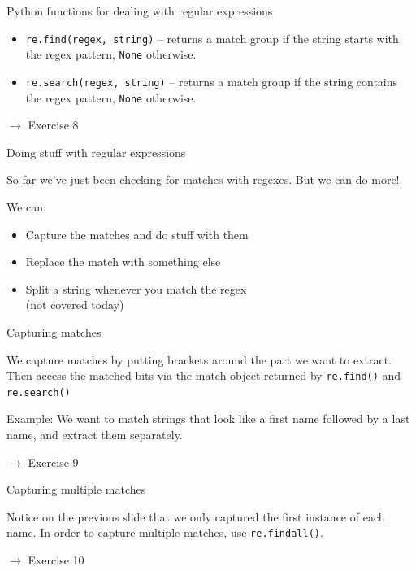 \documentclass{beamer}
\begin{document}
\begin{frame}{Python functions for dealing with regular expressions}

\begin{itemize}
  \item \lstinline$re.find(regex, string)$ -- returns a match group if the string starts with the regex pattern, \lstinline$None$ otherwise.
  \item \lstinline$re.search(regex, string)$ -- returns a match group if the string contains the regex pattern, \lstinline$None$ otherwise.
\end{itemize}

\bigskip
$\rightarrow$ Exercise 8

\end{frame}

\begin{frame}{Doing stuff with regular expressions}

So far we've just been checking for matches with regexes. But we can do more!

\bigskip

We can:
\begin{itemize}
 \item Capture the matches and do stuff with them
 \item Replace the match with something else
 \item Split a string whenever you match the regex \\ (not covered today)
\end{itemize}

\end{frame}

\begin{frame}{Capturing matches}

We capture matches by putting brackets around the part we want to extract.
Then access the matched bits via the match object returned by \lstinline$re.find()$ and \lstinline$re.search()$

\bigskip

Example: We want to match strings that look like a first name followed by a last name,
and extract them separately.



$\rightarrow$ Exercise 9

\end{frame}

\begin{frame}{Capturing multiple matches}

Notice on the previous slide that we only captured the first instance of each name.
In order to capture multiple matches, use \lstinline$re.findall()$.



$\rightarrow$ Exercise 10

\end{frame}
\end{document}
